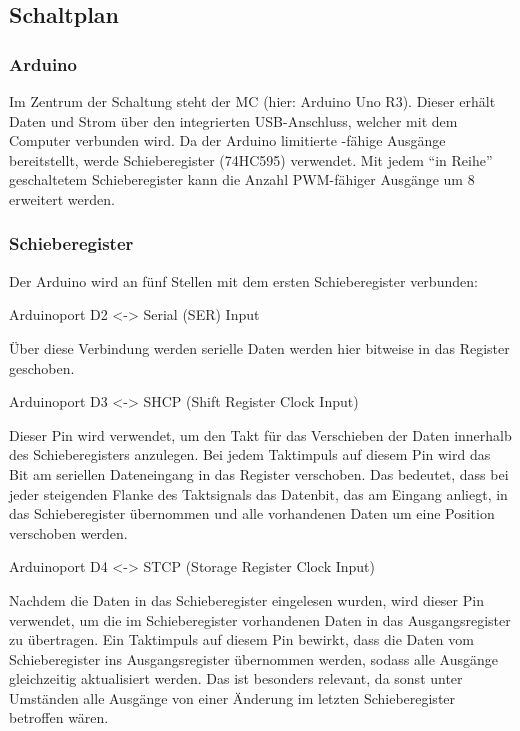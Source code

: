 \subsection{Schaltplan} \label{subsec:schaltplan}
\subsubsection{Arduino}

Im Zentrum der Schaltung steht der \ac{MC} (hier: Arduino Uno R3).
Dieser erhält Daten und Strom über den integrierten USB-Anschluss, welcher mit dem Computer verbunden wird.
Da der Arduino limitierte -fähige Ausgänge bereitstellt, werde Schieberegister (74HC595) verwendet.
Mit jedem \enquote{in Reihe} geschaltetem Schieberegister kann die Anzahl \ac{PWM}-fähiger Ausgänge um 8 erweitert werden.

\subsubsection{Schieberegister}

Der Arduino wird an fünf Stellen mit dem ersten Schieberegister verbunden:

Arduinoport D2 <-> Serial (SER) Input

Über diese Verbindung werden serielle Daten werden hier bitweise in das Register geschoben.

Arduinoport D3 <-> SHCP (Shift Register Clock Input)

Dieser Pin wird verwendet, um den Takt für das Verschieben der Daten innerhalb des Schieberegisters anzulegen.
Bei jedem Taktimpuls auf diesem Pin wird das Bit am seriellen Dateneingang in das Register verschoben.
Das bedeutet, dass bei jeder steigenden Flanke des Taktsignals das Datenbit, das am Eingang anliegt, in das Schieberegister übernommen und alle vorhandenen Daten um eine Position verschoben werden.

Arduinoport D4 <-> STCP (Storage Register Clock Input)

Nachdem die Daten in das Schieberegister eingelesen wurden, wird dieser Pin verwendet, um die im Schieberegister vorhandenen Daten in das Ausgangsregister zu übertragen.
Ein Taktimpuls auf diesem Pin bewirkt, dass die Daten vom Schieberegister ins Ausgangsregister übernommen werden, sodass alle Ausgänge gleichzeitig aktualisiert werden.
Das ist besonders relevant, da sonst unter Umständen alle Ausgänge von einer Änderung im letzten Schieberegister betroffen wären.

